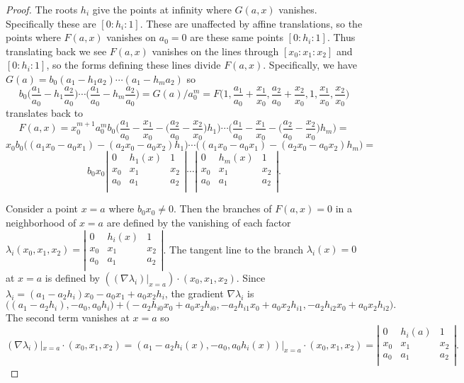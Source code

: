 \documentclass[12pt]{amsart}
\numberwithin{equation}{section}
\theoremstyle{definition}
\begin{document}
\begin{proof}
The roots $h_i$ give the points at infinity where $G(a,x)$ vanishes. Specifically these are
$[0:h_i:1]$. These are unaffected by affine translations, so the points where $F(a,x)$ 
vanishes on $a_0=0$ are these same points $[0:h_i:1]$. 
Thus translating back we see $F(a,x)$ vanishes on the lines through $[x_0:x_1:x_2]$ and $[0:h_i:1]$,
so the forms defining these lines divide $F(a,x)$.
Specifically, we have $G(a)=b_0(a_1-h_1a_2)\cdots(a_1-h_ma_2)$ so
$$b_0\Big(\frac{a_1}{a_0}-h_1\frac{a_2}{a_0}\Big)\cdots\Big(\frac{a_1}{a_0}-h_m\frac{a_2}{a_0}\Big)=G(a)/a_0^m=
F\Big(1,\frac{a_1}{a_0}+\frac{x_1}{x_0},\frac{a_2}{a_0}+\frac{x_2}{x_0},1,\frac{x_1}{x_0},\frac{x_2}{x_0}\Big)$$
translates back to
$$F(a,x)=x_0^{m+1}a_0^mb_0\Big(\frac{a_1}{a_0}-\frac{x_1}{x_0}-\big(\frac{a_2}{a_0}-\frac{x_2}{x_0}\big)h_1\Big)\cdots
\Big(\frac{a_1}{a_0}-\frac{x_1}{x_0}-\big(\frac{a_2}{a_0}-\frac{x_2}{x_0}\big)h_m\Big)=$$
$$x_0b_0\big((a_1x_0-a_0x_1)-(a_2x_0-a_0x_2)h_1\big)\cdots
\big((a_1x_0-a_0x_1)-(a_2x_0-a_0x_2)h_m\big)=$$
$$b_0x_0\left|\begin{array} {ccc}
0 & h_1(x)  & 1\\
x_0 & x_1 & x_2\\
a_0 & a_1 & a_2\\
\end{array}
\right|\cdots
\left|\begin{array} {ccc}
 0 & h_m(x)  & 1\\
x_0 & x_1 & x_2\\
a_0 & a_1 & a_2\\
\end{array}
\right|.$$

Consider a point $x=a$ where $b_0x_0\neq0$. Then the branches of $F(a,x)=0$ in a neighborhood of $x=a$
are defined by the vanishing of each factor $\lambda_i(x_0,x_1,x_2)=\left|\begin{array} {ccc}
0 & h_i(x)  & 1\\
x_0 & x_1 & x_2\\
a_0 & a_1 & a_2\\
\end{array}
\right|$. The tangent line to the branch $\lambda_i(x)=0$ at $x=a$ is defined by
$((\nabla \lambda_i)|_{x=a})\cdot (x_0,x_1,x_2)$.
Since $\lambda_i=(a_1-a_2h_i)x_0-a_0x_1+a_0x_2h_i$, the gradient $\nabla \lambda_i$ is
$$\Big((a_1-a_2h_i),-a_0,a_0h_i\Big)+\Big(-a_2h_{i0}x_0+a_0x_2h_{i0},-a_2h_{i1}x_0+a_0x_2h_{i1},-a_2h_{i2}x_0+a_0x_2h_{i2}\Big).$$
The second term vanishes at $x=a$ so 
$$(\nabla \lambda_i)|_{x=a}\cdot(x_0,x_1,x_2)=(a_1-a_2h_i(x),-a_0,a_0h_i(x))|_{x=a}\cdot(x_0,x_1,x_2)=\left|\begin{array} {ccc}
0 & h_i(a)  & 1\\
x_0 & x_1 & x_2\\
a_0 & a_1 & a_2\\
\end{array}
\right|.$$


\end{proof}
\end{document}

